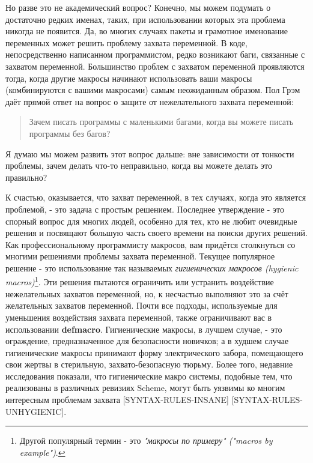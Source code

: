 Но разве это не академический вопрос? Конечно, мы можем подумать о достаточно редких именах, таких, при использовании которых эта проблема никогда не появится. Да, во многих случаях пакеты и грамотное именование переменных может решить проблему захвата переменной. В коде, непосредственно написанном программистом, редко возникают баги, связанные с захватом переменной. Большинство проблем с захватом переменной проявляются тогда, когда другие макросы начинают использовать ваши макросы (комбинируются с вашими макросами) самым неожиданным образом. Пол Грэм даёт прямой ответ на вопрос о защите от нежелательного захвата переменной:

\begin{quote}
Зачем писать программы с маленькими багами, когда вы можете писать программы без багов?
\end{quote}

Я думаю мы можем развить этот вопрос дальше: вне зависимости от тонкости проблемы, зачем делать что-то неправильно, когда вы можете делать это правильно?

К счастью, оказывается, что захват переменной, в тех случаях, когда это является проблемой, - это задача с простым решением. Последнее утверждение - это спорный вопрос для многих людей, особенно для тех, кто не любит очевидные решения и посвящают большую часть своего времени на поиски других решений. Как профессиональному программисту макросов, вам придётся столкнуться со многими решениями проблемы захвата переменной. Текущее популярное решение - это использование так называемых \emph{гигиенических макросов (hygienic macros)}\footnote{Другой популярный термин - это \emph{"макросы по примеру" ("macros by example")}.}. Эти решения пытаются ограничить или устранить воздействие нежелательных захватов переменной, но, к несчастью выполняют это за счёт желательных захватов переменной. Почти все подходы, используемые для уменьшения воздействия захвата переменной, также ограничивают вас в использовании \textbf{defmacro}. Гигиенические макросы, в лучшем случае, - это ограждение, предназначенное для безопасности новичков; а в худшем случае гигиенические макросы принимают форму электрического забора, помещающего свои жертвы в стерильную, захвато-безопасную тюрьму. Более того, недавние исследования показали, что гигиенические макро системы, подобные тем, что реализованы в различных ревизиях Scheme, могут быть уязвимы ко многим интересным проблемам захвата [SYNTAX-RULES-INSANE] [SYNTAX-RULES-UNHYGIENIC].

